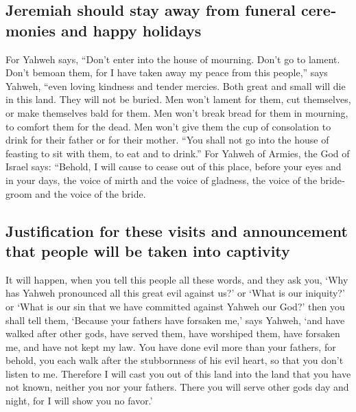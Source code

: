 \begin{paracol}{2}
\begin{otherlanguage}{english}
\hypertarget{jeremiah-should-stay-away-from-funeral-ceremonies-and-happy-holidays}{%
\subsection{Jeremiah should stay away from funeral ceremonies and happy
holidays}\label{jeremiah-should-stay-away-from-funeral-ceremonies-and-happy-holidays}}

 For Yahweh says, ``Don't enter into the house of
mourning. Don't go to lament. Don't bemoan them, for I have taken away
my peace from this people,'' says Yahweh, ``even loving kindness and
tender mercies.  Both great and small will die in this
land. They will not be buried. Men won't lament for them, cut
themselves, or make themselves bald for them.  Men won't
break bread for them in mourning, to comfort them for the dead. Men
won't give them the cup of consolation to drink for their father or for
their mother.  ``You shall not go into the house of
feasting to sit with them, to eat and to drink.''  For
Yahweh of Armies, the God of Israel says: ``Behold, I will cause to
cease out of this place, before your eyes and in your days, the voice of
mirth and the voice of gladness, the voice of the bridegroom and the
voice of the bride.

\hypertarget{justification-for-these-visits-and-announcement-that-people-will-be-taken-into-captivity}{%
\subsection{Justification for these visits and announcement that people
will be taken into
captivity}\label{justification-for-these-visits-and-announcement-that-people-will-be-taken-into-captivity}}

 It will happen, when you tell this people all these
words, and they ask you, `Why has Yahweh pronounced all this great evil
against us?' or `What is our iniquity?' or `What is our sin that we have
committed against Yahweh our God?'  then you shall tell
them, `Because your fathers have forsaken me,' says Yahweh, `and have
walked after other gods, have served them, have worshiped them, have
forsaken me, and have not kept my law.  You have done
evil more than your fathers, for behold, you each walk after the
stubbornness of his evil heart, so that you don't listen to me.
 Therefore I will cast you out of this land into the land
that you have not known, neither you nor your fathers. There you will
serve other gods day and night, for I will show you no favor.'


\end{otherlanguage}
\end{paracol}
